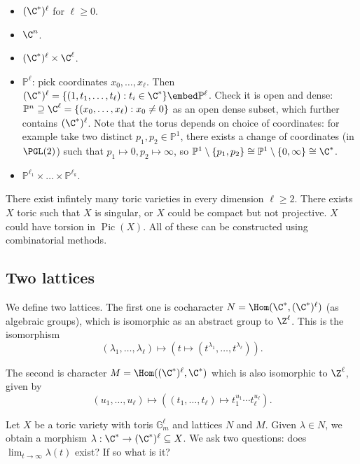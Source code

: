 \documentclass[a4paper]{article}
\renewcommand*{\P}{\mathbb{P}}
\DeclareMathOperator{\Pic}{Pic}
\begin{document}
\begin{eg}\leavevmode
  \begin{itemize}
  \item \((\C^*)^\ell\) for \(\ell \geq 0\).
  \item \(\C^n\).
  \item \((\C^*)^\ell \times \C^\ell\).
  \item \(\P^\ell\): pick coordinates \(x_0, \dots, x_\ell\). Then \((\C^*)^\ell = \{(1, t_1, \dots, t_\ell): t_i \in \C^*\} \embed \P^\ell\). Check it is open and dense: \(\P^n \supseteq \C^\ell = \{(x_0, \dots, x_\ell): x_0 \neq 0\}\) as an open dense subset, which further contains \((\C^*)^\ell\). Note that the torus depends on choice of coordinates: for example take two distinct \(p_1, p_2 \in \P^1\), there exists a change of coordinates (in \(\PGL(2)\)) such that \(p_1 \mapsto 0, p_2 \mapsto \infty\), so \(\P^1 \setminus \{p_1, p_2\} \cong \P^1 \setminus \{0, \infty\} \cong \C^*\).
  \item \(\P^{\ell_1} \times \dots \times \P^{\ell_k}\).
  \end{itemize}
\end{eg}

\begin{remark}
  There exist infintely many toric varieties in every dimension \(\ell \geq 2\). There exists \(X\) toric such that \(X\) is singular, or \(X\) could be compact but not projective. \(X\) could have torsion in \(\Pic(X)\). All of these can be constructed using combinatorial methods.
\end{remark}

\subsection{Two lattices}

We define two lattices. The first one is cocharacter \(N = \Hom(\C^*, (\C^*)^\ell)\) (as algebraic groups), which is isomorphic as an abstract group to \(\Z^\ell\). This is the isomorphism
\[
  (\lambda_1, \dots, \lambda_\ell) \mapsto (t \mapsto (t^{\lambda_1}, \dots, t^{\lambda_\ell})).
\]

The second is character \(M = \Hom((\C^*)^\ell, \C^*)\) which is also isomorphic to \(\Z^\ell\), given by
\[
  (u_1, \dots, u_\ell) \mapsto ((t_1, \dots, t_\ell) \mapsto t_1^{u_1} \cdots t_\ell^{u_\ell}).
\]

Let \(X\) be a toric variety with toris \(\mathbb G_m^\ell\) and lattices \(N\) and \(M\). Given \(\lambda \in N\), we obtain a morphism \(\lambda: \C^* \to (\C^*)^\ell \subseteq X\). We ask two questions: does \(\lim_{t \to \infty} \lambda(t)\) exist? If so what is it?
\end{document}
